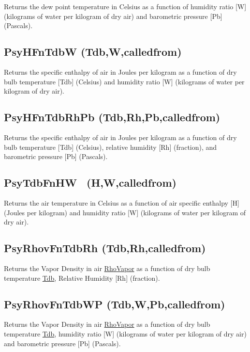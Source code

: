 Returns the dew point temperature in Celsius as a function of humidity ratio {[}W{]} (kilograms of water per kilogram of dry air) and barometric pressure {[}Pb{]} (Pascals).

\subsection{PsyHFnTdbW (Tdb,W,calledfrom)}\label{psyhfntdbw-tdbwcalledfrom}

Returns the specific enthalpy of air in Joules per kilogram as a function of dry bulb temperature {[}Tdb{]} (Celsius) and humidity ratio {[}W{]} (kilograms of water per kilogram of dry air).

\subsection{PsyHFnTdbRhPb (Tdb,Rh,Pb,calledfrom)}\label{psyhfntdbrhpb-tdbrhpbcalledfrom}

Returns the specific enthalpy of air in Joules per kilogram as a function of dry bulb temperature {[}Tdb{]} (Celsius), relative humidity {[}Rh{]} (fraction), and barometric pressure {[}Pb{]} (Pascals).

\subsection{PsyTdbFnHW~ (H,W,calledfrom)}\label{psytdbfnhw-hwcalledfrom}

Returns the air temperature in Celsius as a function of air specific enthalpy {[}H{]} (Joules per kilogram) and humidity ratio {[}W{]} (kilograms of water per kilogram of dry air).

\subsection{PsyRhovFnTdbRh (Tdb,Rh,calledfrom)}\label{psyrhovfntdbrh-tdbrhcalledfrom}

Returns the Vapor Density in air \href{kilograms\%20of\%20water\%20per\%20cubic\%20meter\%20of\%20air}{RhoVapor} as a function of dry bulb temperature \href{Celcius}{Tdb}, Relative Humidity {[}Rh{]} (fraction).

\subsection{PsyRhovFnTdbWP (Tdb,W,Pb,calledfrom)}\label{psyrhovfntdbwp-tdbwpbcalledfrom}

Returns the Vapor Density in air \href{kilograms\%20of\%20water\%20per\%20cubic\%20meter\%20of\%20air}{RhoVapor} as a function of dry bulb temperature \href{Celcius}{Tdb}, humidity ratio {[}W{]} (kilograms of water per kilogram of dry air) and barometric pressure {[}Pb{]} (Pascals).

